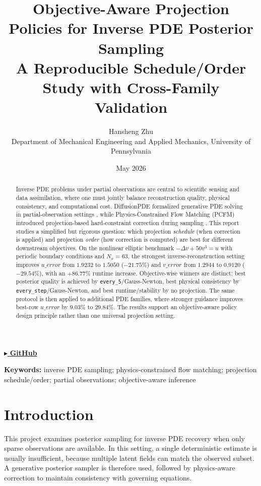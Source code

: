 \documentclass[10pt,twocolumn]{article}
\title{\textbf{Objective-Aware Projection Policies for Inverse PDE Posterior Sampling}\\
\normalsize A Reproducible Schedule/Order Study with Cross-Family Validation}
\author{Hansheng Zhu\\
\small Department of Mechanical Engineering and Applied Mechanics, University of Pennsylvania}
\date{May 2026}
\begin{document}
\maketitle
\begin{center}
\href{https://github.com/hanshengzhu0001/meam4600_final_proj}{\textcolor{deepblue}{\large \(\blacktriangleright\) \textbf{GitHub}}}
\end{center}
\vspace{-0.5em}

\begin{abstract}
Inverse PDE problems under partial observations are central to scientific sensing and data assimilation, where one must jointly balance reconstruction quality, physical consistency, and computational cost. DiffusionPDE formalized generative PDE solving in partial-observation settings \cite{diffusionpde}, while Physics-Constrained Flow Matching (PCFM) introduced projection-based hard-constraint correction during sampling \cite{pcfm}. This report studies a simplified but rigorous question: which projection \emph{schedule} (when correction is applied) and projection \emph{order} (how correction is computed) are best for different downstream objectives. On the nonlinear elliptic benchmark \(-\Delta v + 50v^3 = u\) with periodic boundary conditions and \(N_x=63\), the strongest inverse-reconstruction setting improves \(u\_error\) from \(1.9232\) to \(1.5050\) (\(-21.75\%\)) and \(v\_error\) from \(1.2944\) to \(0.9120\) (\(-29.54\%\)), with an \(+86.77\%\) runtime increase. Objective-wise winners are distinct: best posterior quality is achieved by \texttt{every\_5}/Gauss-Newton, best physical consistency by \texttt{every\_step}/Gauss-Newton, and best runtime/stability by no projection. The same protocol is then applied to additional PDE families, where stronger guidance improves best-row \(u\_error\) by \(9.03\%\) to \(29.84\%\). The results support an objective-aware policy design principle rather than one universal projection setting.
\end{abstract}
\vspace{-0.35em}
\textbf{Keywords:} inverse PDE sampling; physics-constrained flow matching; projection schedule/order; partial observations; objective-aware inference
\vspace{0.2em}

\section{Introduction}
This project examines posterior sampling for inverse PDE recovery when only sparse observations are available. In this setting, a single deterministic estimate is usually insufficient, because multiple latent fields can match the observed subset. A generative posterior sampler is therefore used, followed by physics-aware correction to maintain consistency with governing equations.
\end{document}
